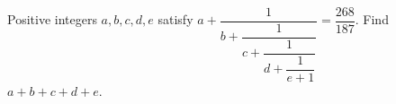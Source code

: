 Positive integers $a,b,c,d,e$ satisfy $a+\dfrac{1}{b+\dfrac{1}{c+\dfrac{1}{d+\dfrac{1}{e+1}}}}=\dfrac{268}{187}$. Find $a+b+c+d+e$.
